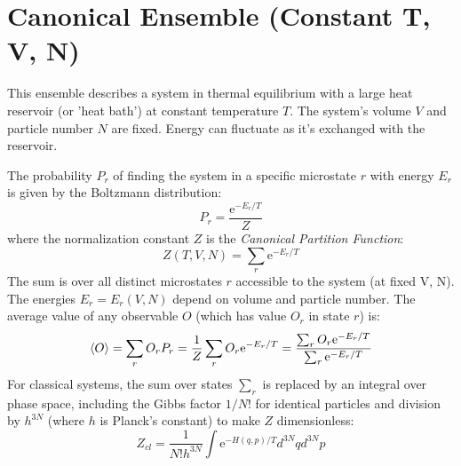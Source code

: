 \documentclass[10pt, letterpaper]{article}
\newcommand{\avg}[1]{\expval{#1}} %
\newcommand{\mathe}{\mathrm{e}} %
\begin{document}
\section{Canonical Ensemble (Constant T, V, N)}
This ensemble describes a system in thermal equilibrium with a large heat reservoir (or 'heat bath') at constant temperature $T$. The system's volume $V$ and particle number $N$ are fixed. Energy can fluctuate as it's exchanged with the reservoir.

The probability $P_r$ of finding the system in a specific microstate $r$ with energy $E_r$ is given by the Boltzmann distribution:
\begin{equation}
    P_r = \frac{\mathe^{-E_r / T}}{Z}
\end{equation}
where the normalization constant $Z$ is the \textit{Canonical Partition Function}:
\begin{equation}
    Z(T, V, N) = \sum_r \mathe^{-E_r / T}
\end{equation}
The sum is over all distinct microstates $r$ accessible to the system (at fixed V, N). The energies $E_r = E_r(V, N)$ depend on volume and particle number.
The average value of any observable $O$ (which has value $O_r$ in state $r$) is:
\begin{equation}
    \avg{O} = \sum_r O_r P_r = \frac{1}{Z} \sum_r O_r \mathe^{-E_r / T} = \frac{\sum_r O_r \mathe^{-E_r / T}}{\sum_r \mathe^{-E_r / T}}
\end{equation}
For classical systems, the sum over states $\sum_r$ is replaced by an integral over phase space, including the Gibbs factor $1/N!$ for identical particles and division by $h^{3N}$ (where $h$ is Planck's constant) to make $Z$ dimensionless:
\begin{equation*}
    Z_{cl} = \frac{1}{N! h^{3N}} \int \mathe^{-H(q,p)/T} d^{3N}q d^{3N}p
\end{equation*}
\end{document}
